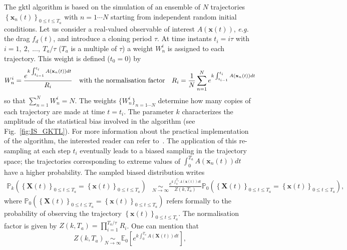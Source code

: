 \documentclass{jfm}
\begin{document}
The \ac{gktl} algorithm is based on the simulation of an ensemble of $N$ trajectories $\left\{\mathbf{x}_{n}(t)\right\}_{0\leq t \leq T_a}$ with $ n =1 \cdots N$ starting from independent random initial conditions.
%
Let us consider a real-valued observable of interest $A(\mathbf{x}(t))$, {\emph{e.g.} the drag $f_d(t)$}, and introduce a cloning period $\tau$.
%
At time instants $t_{i}=i\tau$ with $i=1,~2,~...,~T_{a}/\tau$ ($T_{a}$ is a multiple of $\tau$) a weight $W_{n}^{i}$ is assigned to each trajectory. This weight is defined ($t_0=0$) by
%
\begin{equation}
W_{n}^{i}=\frac{e^{k\intop_{t_{i-1}}^{t_{i}}A(\mathbf{x}_{n}(t))dt}}{R_{i}}\quad \mbox{with the normalisation factor} \quad R_{i}=\frac{1}{N}\sum_{n=1}^{N}e^{k\int_{t_{i-1}}^{t_{i}}A(\mathbf{x}_{n}(t))dt}
\label{eq:Weight}
\end{equation}
so that $\sum_{n=1}^N W_n^i = N$.
%
%
{The weights $\{W_{n}^{i}\}_{n=1\cdots N}$ determine how many copies of each trajectory are made at time $t=t_i$. The parameter $k$ characterizes the amplitude of the statistical bias involved in the algorithm (see Fig.~\ref{fig:IS_GKTL}). For more information about the practical implementation of the algorithm, the interested reader can refer to~\citep{brewer2018efficient, lestang:tel-01974316}}.
The application of this re-sampling at each step $t_i$ eventually leads to a biased sampling in the trajectory space; the trajectories corresponding to extreme values of $\int_{0}^{T_a}A(\mathbf{x}_{n}(t))dt$ have a higher probability.
%
The sampled biased distribution writes
%
\begin{align}
\mathbb{P}_{k}\left(\left\{ \mathbf{X}(t)\right\} _{0\leq t\leq T_{a}}=\left\{ \mathbf{x}(t)\right\} _{0\leq t\leq T_{a}}\right) &\underset{N\rightarrow\infty}{\sim} \frac{e^{k\int_{0}^{T_{a}}A(\mathbf{x}(t))dt}}{Z(k,T_a)}\mathbb{\mathbb{P}}_{0}\left(\left\{ \mathbf{X}(t)\right\} _{0\leq t\leq T_{a}}=\left\{ \mathbf{x}(t)\right\} _{0\leq t\leq T_{a}}\right),
\label{eq:Biased_Path_Approximation}
\end{align}
where
$\mathbb{P}_{0}\left(\left\{ \mathbf{X}(t)\right\} _{0\leq t\leq T_{a}} = \left\{ \mathbf{x}(t)\right\} _{0\leq t\leq T_{a}}\right)$ 
refers formally to the probability of observing the trajectory 
$\left\{ \mathbf{x}(t)\right\} _{0\leq t\leq T_{a}}$.
The normalisation factor is given by $Z(k,T_a)=\prod_{i=1}^{T_a/\tau}R_i$.
%
One can mention that
\begin{equation}
\label{eq:mean_field}
Z(k,T_a) \underset{N\to \infty}{\sim} \mathbb{E}_0\left[e^{k\int_{0}^{T_{a}}A(\mathbf{X}(t))dt}\right],
\end{equation}
\end{document}
